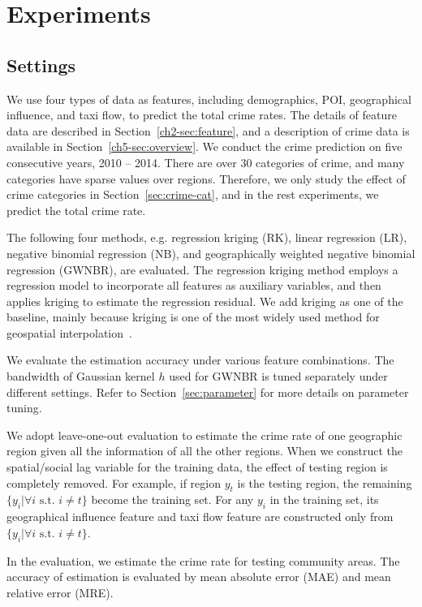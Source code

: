 \section{Experiments}
\label{ch5-sec:experiment}


\subsection{Settings}

We use four types of data as features, including demographics, POI, geographical influence, and taxi flow, to predict the total crime rates. The details of feature data are described in Section~\ref{ch2-sec:feature}, and a description of crime data is available in Section~\ref{ch5-sec:overview}. We conduct the crime prediction on five consecutive years, 2010 -- 2014. There are over 30 categories of crime, and many categories have sparse values over regions. Therefore, we only study the effect of crime categories in Section~\ref{sec:crime-cat}, and in the rest experiments, we predict the total crime rate.

The following four methods, e.g. regression kriging (RK), linear regression (LR), negative binomial regression (NB), and geographically weighted negative binomial regression (GWNBR), are evaluated. The regression kriging method employs a regression model to incorporate all features as auxiliary variables, and then applies kriging to estimate the regression residual. We add kriging as one of the baseline, mainly because kriging is one of the most widely used method for geospatial interpolation~\cite{OlWe90}.

We evaluate the estimation accuracy under various feature combinations. The bandwidth of Gaussian kernel $h$ used for GWNBR is tuned separately under different settings. Refer to Section~\ref{sec:parameter} for more details on parameter tuning.

We adopt leave-one-out evaluation to estimate the crime rate of one geographic region given all the information of all the other regions. When we construct the spatial/social lag variable for the training data, the effect of testing region is completely removed. For example, if region $y_t$ is the testing region, the remaining $\{y_i | \forall i \text{ s.t. } i \neq t\}$ become the training set. For any $y_i$ in the training set, its geographical influence feature and taxi flow feature are constructed only from $\{y_i | \forall i \text{ s.t. } i \neq t\}$.

In the evaluation, we estimate the crime rate for testing community areas. The accuracy of estimation is evaluated by mean absolute error (MAE) and mean relative error (MRE).

